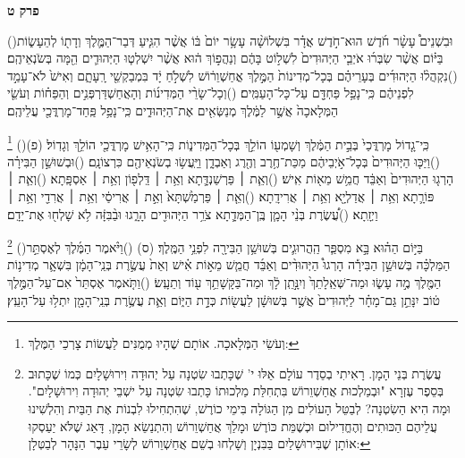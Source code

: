 \documentclass[12pt, openany]{book}
\newcommand{\sethebfont}{
\fontsize{10.5pt}{13.1pt} \selectfont
}
\newcommand{\twocol}[1]{
	{\sethebfont \begin{multicols}{2}
			#1
	\end{multicols}}	
}
\newcommand{\chapname}{}
\newcommand{\newchap}[1]{
	\addcontentsline{toc}{chapter}{#1}
	\renewcommand{\chapname}{#1}
		\begin{center}
			\textbf{%
\fontsize{16pt}{16pt}\selectfont
				#1}
		\end{center}
}
\newcommand{\footnotecomment}[1]{
	\renewcommand\thefootnote{}
	\footnote{#1}}
\newcommand{\commenta}[1]{\footnotecomment{#1}\hspace{0em}}
\newcommand{\vsnum}[1]{(\hebrewnumeral{#1})\space}
\begin{document}
\newchap{פרק ט}
\twocol{\vsnum{1}וּבִשְׁנֵים֩ עָשָׂ֨ר חֹ֜דֶשׁ הוּא־חֹ֣דֶשׁ אֲדָ֗ר בִּשְׁלוֹשָׁ֨ה עָשָׂ֥ר יוֹם֙ בּ֔וֹ אֲשֶׁ֨ר הִגִּ֧יעַ דְּבַר־הַמֶּ֛לֶךְ וְדָת֖וֹ לְהֵעָשׂ֑וֹת בַּיּ֗וֹם אֲשֶׁ֨ר שִׂבְּר֜וּ אֹיְבֵ֤י הַיְּהוּדִים֙ לִשְׁל֣וֹט בָּהֶ֔ם וְנַהֲפ֣וֹךְ ה֔וּא אֲשֶׁ֨ר יִשְׁלְט֧וּ הַיְּהוּדִ֛ים הֵ֖מָּה בְּשֹׂנְאֵיהֶֽם׃
\vsnum{2}נִקְהֲל֨וּ הַיְּהוּדִ֜ים בְּעָרֵיהֶ֗ם בְּכָל־מְדִינוֹת֙ הַמֶּ֣לֶךְ אֳחַשְׁוֵר֔וֹשׁ לִשְׁלֹ֣חַ יָ֔ד בִּמְבַקְשֵׁ֖י רָֽעָתָ֑ם וְאִישׁ֙ לֹא־עָמַ֣ד לִפְנֵיהֶ֔ם כִּֽי־נָפַ֥ל פַּחְדָּ֖ם עַל־כָּל־הָעַמִּֽים׃
\vsnum{3}וְכָל־שָׂרֵ֨י הַמְּדִינ֜וֹת וְהָאֲחַשְׁדַּרְפְּנִ֣ים וְהַפַּח֗וֹת וְעֹשֵׂ֤י הַמְּלָאכָה֙ אֲשֶׁ֣ר לַמֶּ֔לֶךְ מְנַשְּׂאִ֖ים אֶת־הַיְּהוּדִ֑ים כִּֽי־נָפַ֥ל פַּֽחַד־מָרְדֳּכַ֖י עֲלֵיהֶֽם׃%
\commenta{וְעֹשֵׂי הַמְּלָאכָה. אוֹתָם שֶׁהָיוּ מְמֻנִּים לַעֲשׂוֹת צָרְכֵי הַמֶּלֶךְ:}%
\vsnum{4}כִּֽי־גָ֤דוֹל מָרְדֳּכַי֙ בְּבֵ֣ית הַמֶּ֔לֶךְ וְשָׁמְע֖וֹ הוֹלֵ֣ךְ בְּכָל־הַמְּדִינ֑וֹת כִּֽי־הָאִ֥ישׁ מָרְדֳּכַ֖י הוֹלֵ֥ךְ וְגָדֽוֹל׃ (פ)
\vsnum{5}וַיַּכּ֤וּ הַיְּהוּדִים֙ בְּכָל־אֹ֣יְבֵיהֶ֔ם מַכַּת־חֶ֥רֶב וְהֶ֖רֶג וְאַבְדָ֑ן וַיַּֽעֲשׂ֥וּ בְשֹׂנְאֵיהֶ֖ם כִּרְצוֹנָֽם׃
\vsnum{6}וּבְשׁוּשַׁ֣ן הַבִּירָ֗ה הָרְג֤וּ הַיְּהוּדִים֙ וְאַבֵּ֔ד חֲמֵ֥שׁ מֵא֖וֹת אִֽישׁ׃
\vsnum{7}וְאֵ֧ת ׀ פַּרְשַׁנְדָּ֛תָא וְאֵ֥ת ׀ דַּֽלְפ֖וֹן וְאֵ֥ת ׀ אַסְפָּֽתָא׃
\vsnum{8}וְאֵ֧ת ׀ פּוֹרָ֛תָא וְאֵ֥ת ׀ אֲדַלְיָ֖א וְאֵ֥ת ׀ אֲרִידָֽתָא׃
\vsnum{9}וְאֵ֤ת ׀ פַּרְמַ֙שְׁתָּא֙ וְאֵ֣ת ׀ אֲרִיסַ֔י וְאֵ֥ת ׀ אֲרִדַ֖י וְאֵ֥ת ׀ וַיְזָֽתָא׃
\vsnum{10}עֲ֠שֶׂרֶת בְּנֵ֨י הָמָ֧ן בֶּֽן־הַמְּדָ֛תָא צֹרֵ֥ר הַיְּהוּדִ֖ים הָרָ֑גוּ וּבַ֨בִּזָּ֔ה לֹ֥א שָׁלְח֖וּ אֶת־יָדָֽם׃%
\commenta{עֲשֶׂרֶת בְּנֵי הָמָן. רָאִיתִי בְסֵדֶר עוֹלָם אֵלּוּ י' שֶׁכָּתְבוּ שִׂטְנָה עַל יְהוּדָה וִירוּשָׁלָיִם כְּמוֹ שֶׁכָּתוּב בְּסֵפֶר עֶזְרָא "וּבְמַלְכוּת אֲחַשְׁוֵרוֹשׁ בִּתְחִלַּת מַלְכוּתוֹ כָּתְבוּ שִׂטְנָה עַל ישְׁבֵי יְהוּדָה וִירוּשָׁלָיִם". וּמָה הִיא הַשִׂטְנָה? לְבַטֵּל הָעוֹלִים מִן הַגּוֹלָה בִּימֵי כוֹרֶשׁ, שֶׁהִתְחִילוּ לִבְנוֹת אֶת הַבַּיִת וְהִלְשִׁינוּ עֲלֵיהֶם הַכּוּתִים וְהֶחֱדִילוּם וּכְשֶׁמֵּת כּוֹרֶשׁ וּמָלַךְ אֲחַשְׁוֵרוֹשׁ וְהִתְנַשֵׂא הָמָן, דָּאַג שֶׁלֹּא יַעַסְקוּ אוֹתָן שֶׁבִּירוּשָׁלַיִם בַּבִּנְיָן וְשָׁלְחוּ בְשֵׁם אֲחַשְׁוֵרוֹשׁ לְשָׂרֵי עֵבֶר הַנָּהָר לְבַטְּלָן: }%
\vsnum{11}בַּיּ֣וֹם הַה֗וּא בָּ֣א מִסְפַּ֧ר הַֽהֲרוּגִ֛ים בְּשׁוּשַׁ֥ן הַבִּירָ֖ה לִפְנֵ֥י הַמֶּֽלֶךְ׃ (ס)
\vsnum{12}וַיֹּ֨אמֶר הַמֶּ֜לֶךְ לְאֶסְתֵּ֣ר הַמַּלְכָּ֗ה בְּשׁוּשַׁ֣ן הַבִּירָ֡ה הָרְגוּ֩ הַיְּהוּדִ֨ים וְאַבֵּ֜ד חֲמֵ֧שׁ מֵא֣וֹת אִ֗ישׁ וְאֵת֙ עֲשֶׂ֣רֶת בְּנֵֽי־הָמָ֔ן בִּשְׁאָ֛ר מְדִינ֥וֹת הַמֶּ֖לֶךְ מֶ֣ה עָשׂ֑וּ וּמַה־שְּׁאֵֽלָתֵךְ֙ וְיִנָּ֣תֵֽן לָ֔ךְ וּמַה־בַּקָּשָׁתֵ֥ךְ ע֖וֹד וְתֵעָֽשׂ׃
\vsnum{13}וַתֹּ֤אמֶר אֶסְתֵּר֙ אִם־עַל־הַמֶּ֣לֶךְ ט֔וֹב יִנָּתֵ֣ן גַּם־מָחָ֗ר לַיְּהוּדִים֙ אֲשֶׁ֣ר בְּשׁוּשָׁ֔ן לַעֲשׂ֖וֹת כְּדָ֣ת הַיּ֑וֹם וְאֵ֛ת עֲשֶׂ֥רֶת בְּנֵֽי־הָמָ֖ן יִתְל֥וּ עַל־הָעֵֽץ׃%
}
\end{document}
